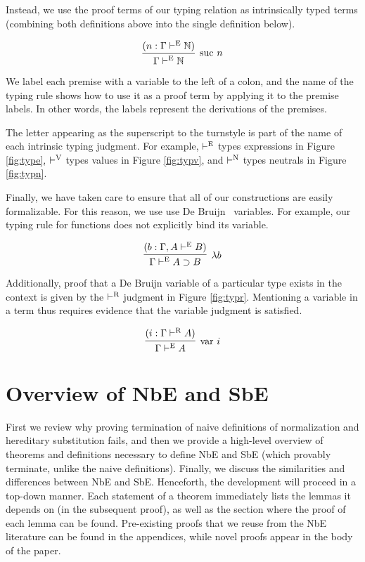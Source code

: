 \documentclass{llncs}
\newcommand{\reffig}[1]{Figure \ref{fig:#1}}
\def\arr{\supset}
\def\lam{\lambda}
\def\nat{\mathbb{N}}
\newcommand{\turn}[1]{\vdash^\con{#1}}
\newcommand{\con}[1]{\textmd{#1}}
\newcommand{\fun}[1]{\textmd{#1}}
\newcommand{\type}[1]{\Gamma \turn{E} #1}
\newcommand{\ctype}[2]{\Gamma , #1 \turn{E} #2}
\newcommand{\typr}[1]{\Gamma \turn{R} #1}
\begin{document}
Instead, we use the proof terms of our typing relation as
intrinsically typed terms (combining both definitions above into the
single definition below).

$$
\infer
  [\con{suc} ~ n]
  {\type{\nat}}
{
  (n : \type{\nat})
}
$$

We label each premise with a variable to
the left of a colon, and the name of the typing rule shows how to use
it as a proof term by applying it to the premise labels. In other
words, the labels represent the derivations of the premises.

The letter appearing as the superscript to the turnstyle is part of
the name of each intrinsic typing judgment. For example, $\turn{E}$
types expressions in \reffig{type}, $\turn{V}$ types values in
\reffig{typv}, and $\turn{N}$ types neutrals in \reffig{typn}.

Finally, we have taken care to ensure that all of our constructions
are easily formalizable. For this reason, we
use use De Bruijn~\cite{TODO} variables. For example, our typing rule
for functions does not explicitly bind its variable.

$$
\infer
  [\lam b]
  {\type{A \arr B}}
{
  (b : \ctype{A}{B})
}
$$

Additionally, proof that a De Bruijn variable of a particular type
exists in the context is given by the $\turn{R}$ judgment in
\reffig{typr}. Mentioning a variable in a term thus requires evidence
that the variable judgment is satisfied.

$$
\infer
  [\fun{var} ~ i]
  {\type{A}}
{
  (i : \typr{A})
}
$$

\section{Overview of NbE and SbE}
\label{sec:overview}

First we review why proving termination of naive definitions of
normalization and hereditary substitution fails, and then we provide a
high-level overview of theorems and definitions necessary to define NbE
and SbE (which provably terminate, unlike the naive definitions).
Finally, we discuss the similarities and differences between NbE and
SbE.
Henceforth, the development will proceed in a top-down manner.
Each statement of a theorem immediately lists the lemmas it depends on
(in the subsequent proof), as well as
the section where the proof of each lemma can be found. Pre-existing
proofs that we reuse from the NbE literature can be found in the
appendices, while novel proofs appear in the body of the paper.
\end{document}
